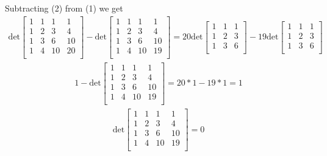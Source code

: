 \documentclass[a4paper,11pt]{article}
\begin{document}
Subtracting (2) from (1) we get
\begin{align}
\text{det}
\begin{bmatrix}
1 & 1 & 1 & 1 \\
1 & 2 & 3 & 4 \\
1 & 3 & 6 & 10 \\
1 & 4 & 10 & 20 \\
\end{bmatrix}-
\text{det}
\begin{bmatrix}
1 & 1 & 1 & 1 \\
1 & 2 & 3 & 4 \\
1 & 3 & 6 & 10 \\
1 & 4 & 10 & 19 \\
\end{bmatrix}=
20\text{det}
\begin{bmatrix}
1 & 1 & 1  \\
1 & 2 & 3  \\
1 & 3 & 6  \\ 
\end{bmatrix}-
19\text{det}
\begin{bmatrix}
1 & 1 & 1  \\
1 & 2 & 3  \\
1 & 3 & 6  \\ 
\end{bmatrix}
\end{align}
\begin{align}
1-
\text{det}
\begin{bmatrix}
1 & 1 & 1 & 1 \\
1 & 2 & 3 & 4 \\
1 & 3 & 6 & 10 \\
1 & 4 & 10 & 19 \\
\end{bmatrix}=
20*1-
19*1=1
\end{align}
\begin{align}
\text{det}
\begin{bmatrix}
1 & 1 & 1 & 1 \\
1 & 2 & 3 & 4 \\
1 & 3 & 6 & 10 \\
1 & 4 & 10 & 19 \\
\end{bmatrix}=
0
\end{align}
\end{document}
